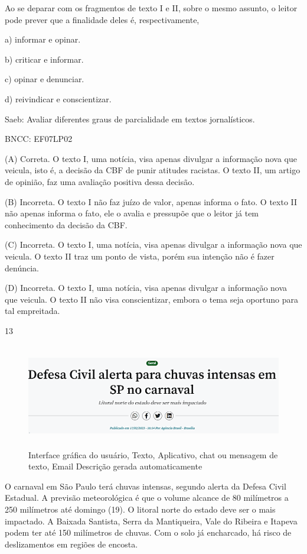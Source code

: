 Ao se deparar com os fragmentos de texto I e II, sobre o mesmo assunto,
o leitor pode prever que a finalidade deles é, respectivamente,

a) informar e opinar.

b) criticar e informar.

c) opinar e denunciar.

d) reivindicar e conscientizar.

Saeb: Avaliar diferentes graus de parcialidade em textos jornalísticos.

BNCC: EF07LP02

(A) Correta. O texto I, uma notícia, visa apenas divulgar a informação
nova que veicula, isto é, a decisão da CBF de punir atitudes racistas. O
texto II, um artigo de opinião, faz uma avaliação positiva dessa
decisão.

(B) Incorreta. O texto I não faz juízo de valor, apenas informa o fato.
O texto II não apenas informa o fato, ele o avalia e pressupõe que o
leitor já tem conhecimento da decisão da CBF.

(C) Incorreta. O texto I, uma notícia, visa apenas divulgar a informação
nova que veicula. O texto II traz um ponto de vista, porém sua intenção
não é fazer denúncia.

(D) Incorreta. O texto I, uma notícia, visa apenas divulgar a informação
nova que veicula. O texto II não visa conscientizar, embora o tema seja
oportuno para tal empreitada.

\num{13}

\begin{figure}
\centering
\includegraphics[width=5.90556in,height=1.78681in]{./imgSAEB_8_POR/media/image4.png}
\caption{Interface gráfica do usuário, Texto, Aplicativo, chat ou
mensagem de texto, Email Descrição gerada automaticamente}
\end{figure}

O carnaval em São Paulo terá chuvas intensas, segundo alerta da Defesa
Civil Estadual. A previsão meteorológica é que o volume alcance de 80
milímetros a 250 milímetros até domingo (19). O litoral norte do estado
deve ser o mais impactado. A Baixada Santista, Serra da Mantiqueira,
Vale do Ribeira e Itapeva podem ter até 150 milímetros de chuvas. Com o
solo já encharcado, há risco de deslizamentos em regiões de encosta.

